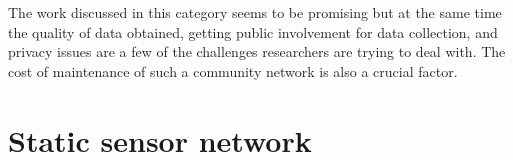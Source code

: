 The work discussed in this category seems to be promising but at the same time the quality of data obtained, getting public involvement for data collection, and privacy issues \cite{Yi2015} are a few of the challenges researchers are trying to deal with. The cost of maintenance of such a community network is also a crucial factor.






\section{Static sensor network}

